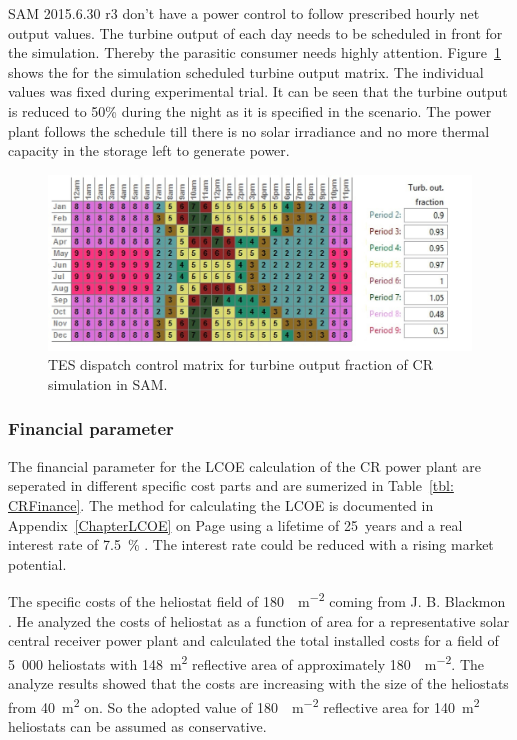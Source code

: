 SAM 2015.6.30 r3 don't have a power control to follow prescribed hourly net output values. The turbine output of each day needs to be scheduled in front for the simulation. Thereby the parasitic consumer needs highly attention. Figure~\ref{CR_turbineoutput} shows the for the simulation scheduled turbine output matrix. The individual values was fixed during experimental trial. It can be seen that the turbine output is reduced to 50\% during the night as it is specified in the scenario. The power plant follows the schedule till there is no solar irradiance and no more thermal capacity in the storage left to generate power. 
\begin{figure}[htbp]  
\centering
\includegraphics[width=0.95\linewidth]{FIG/CR_turbineoutput}
\caption[TES dispatch control matrix for turbine output fraction of CR simulation in SAM.]{TES dispatch control matrix for turbine output fraction of CR simulation in SAM.}\label{CR_turbineoutput}
\end{figure}
\pagebreak
\subsubsection{Financial parameter}
The financial parameter for the LCOE calculation of the CR power plant are seperated in different specific cost parts and are sumerized in Table~\ref{tbl: CRFinance}. The method for calculating the LCOE is documented in Appendix~\ref{ChapterLCOE} on Page \pageref{ChapterLCOE} using a lifetime of \SI{25}{years} and a real interest rate of 7.5~\% \cite{FraunhoferISE2013}. The interest rate could be reduced with a rising market potential.




The specific costs of the heliostat field of \SI{180}{\usd\per\square\metre} coming from J. B. Blackmon \cite{Blackmon2012}. He analyzed the costs of heliostat as a function of area for a representative solar central receiver power plant and calculated the total installed costs for a field of 5~000 heliostats with \SI{148}{\square\metre} reflective area of approximately \SI{180}{\usd\per\square\metre}. The analyze results showed that the costs are increasing with the size of the heliostats from \SI{40}{\square\metre} on. So the adopted value of \SI{180}{\usd\per\square\metre} reflective area for \SI{140}{\square\metre} heliostats can be assumed as conservative.


